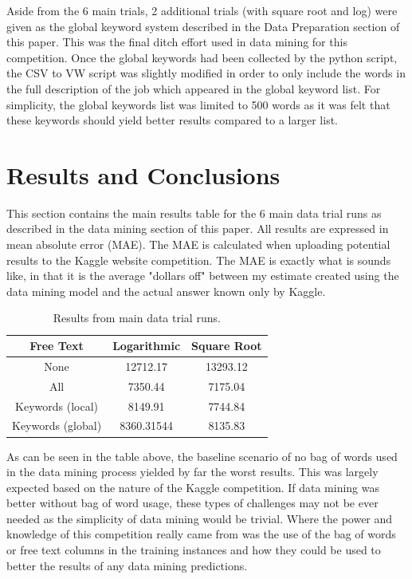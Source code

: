 \documentclass[conference]{IEEEtran}
\begin{document}
Aside from the 6 main trials, 2 additional trials (with square root and log) were
given as the global keyword system described in the Data Preparation section of
this paper. This was the final ditch effort used in data mining for this competition.
Once the global keywords had been collected by the python script, the CSV to
VW script was slightly modified in order to only include the words in the full
description of the job which appeared in the global keyword list. For simplicity,
the global keywords list was limited to 500 words as it was felt that these keywords
should yield better results compared to a larger list.

\section{Results and Conclusions}

This section contains the main results table for the 6 main data trial runs as
described in the data mining section of this paper. All results are expressed in
mean absolute error (MAE). The MAE is calculated when uploading potential
results to the Kaggle website competition. The MAE is exactly what is sounds
like, in that it is the average "dollars oﬀ" between my estimate created using
the data mining model and the actual answer known only by Kaggle.

\begin{table}[h]
\begin{center}
\begin{tabular}{| c | c | c |}
\hline
Free Text & Logarithmic & Square Root \\
\hline
\hline
None & 12712.17 & 13293.12 \\ \hline
All & 7350.44 & 7175.04 \\ \hline
Keywords (local) & 8149.91 & 7744.84 \\ \hline
Keywords (global) & 8360.31544 & 8135.83 \\ \hline
\end{tabular}
\end{center}
\caption{Results from main data trial runs.\label{tab:results}}
\end{table}

As can be seen in the table above, the baseline scenario of no bag of words used
in the data mining process yielded by far the worst results. This was largely
expected based on the nature of the Kaggle competition. If data mining was
better without bag of word usage, these types of challenges may not be ever
needed as the simplicity of data mining would be trivial. Where the power and
knowledge of this competition really came from was the use of the bag of words or
free text columns in the training instances and how they could be used to better
the results of any data mining predictions.
\end{document}
